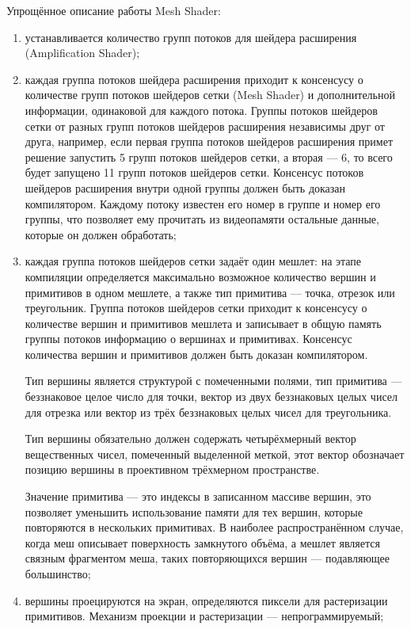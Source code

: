 Упрощённое описание работы Mesh Shader:
\begin{enumerate}
    \item устанавливается количество групп потоков для шейдера расширения (Amplification Shader);
    \item каждая группа потоков шейдера расширения приходит к консенсусу о количестве групп потоков шейдеров сетки (Mesh Shader) и дополнительной информации, одинаковой для каждого потока.
    Группы потоков шейдеров сетки от разных групп потоков шейдеров расширения независимы друг от друга, например, если первая группа потоков шейдеров расширения примет решение запустить 5 групп потоков шейдеров сетки, а вторая --- 6, то всего будет запущено 11 групп потоков шейдеров сетки.
    Консенсус потоков шейдеров расширения внутри одной группы должен быть доказан компилятором.
    Каждому потоку известен его номер в группе и номер его группы, что позволяет ему прочитать из видеопамяти остальные данные, которые он должен обработать;

    \item каждая группа потоков шейдеров сетки задаёт один мешлет: на этапе компиляции определяется максимально возможное количество вершин и примитивов в одном мешлете, а также тип примитива --- точка, отрезок или треугольник.
    Группа потоков шейдеров сетки приходит к консенсусу о количестве вершин и примитивов мешлета и записывает в общую память группы потоков информацию о вершинах и примитивах.
    Консенсус количества вершин и примитивов должен быть доказан компилятором.

    Тип вершины является структурой с помеченными полями, тип примитива --- беззнаковое целое число для точки, вектор из двух беззнаковых целых чисел для отрезка или вектор из трёх беззнаковых целых чисел для треугольника.

    Тип вершины обязательно должен содержать четырёхмерный вектор вещественных чисел, помеченный выделенной меткой, этот вектор обозначает позицию вершины в проективном трёхмерном пространстве.

    Значение примитива --- это индексы в записанном массиве вершин, это позволяет уменьшить использование памяти для тех вершин, которые повторяются в нескольких примитивах.
    В наиболее распространённом случае, когда меш описывает поверхность замкнутого объёма, а мешлет является связным фрагментом меша, таких повторяющихся вершин --- подавляющее большинство;

    \item вершины проецируются на экран, определяются пиксели для растеризации примитивов.
    Механизм проекции и растеризации --- непрограммируемый;


\end{enumerate}
